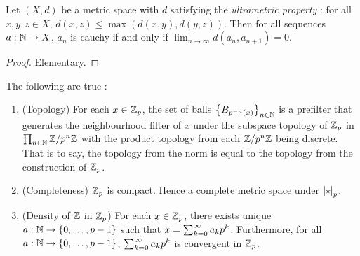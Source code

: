 \begin{prop}
  
  Let $(X,d)$ be a metric space with 
  $d$ satisfying the \emph{ultrametric property} : 
  for all $x, y, z \in X$, $d(x,z) \leq \max(d(x,y),d(y,z))$.
  Then for all sequences $a : \mathbb{N} \to X$, 
  $a_n$ is cauchy if and only if $\lim_{n\to\infty} d(a_n,a_{n+1}) = 0$.
\end{prop}
\begin{proof}
  Elementary. 
\end{proof}

\begin{prop}

  The following are true : 
  \begin{enumerate}
    \item (Topology) 
    For each $x \in \mathbb{Z}_p$, 
    the set of balls $\left\{B_{p^{-n}(x)}\right\}_{n \in \mathbb{N}}$ is 
    a prefilter that generates the neighbourhood filter of $x$
    under the subspace topology of $\mathbb{Z}_p$ in $\prod_{n \in \mathbb{N}}^{}\mathbb{Z}/p^n\mathbb{Z}$ with 
    the product topology from each $\mathbb{Z}/p^n\mathbb{Z}$ being discrete. 
    That is to say, the topology from the norm is equal to 
    the topology from the construction of $\mathbb{Z}_p$. 
    \item (Completeness)
    $\mathbb{Z}_p$ is compact.
    Hence a complete metric space under $\left\vert \star \right\vert_p$. 
    \item (Density of $\mathbb{Z}$ in $\mathbb{Z}_p$)
    For each $x \in \mathbb{Z}_p$, 
    there exists unique $a : \mathbb{N} \to \left\{0,\dots,p-1\right\}$ such that 
    $x = \sum_{k = 0}^{\infty} a_k p^k$.
    Furthermore, for all $a : \mathbb{N} \to \left\{0, \dots, p-1\right\}$, 
    $\sum_{k = 0}^{\infty} a_k p^k$ is convergent in $\mathbb{Z}_p$. 
  \end{enumerate}
\end{prop}
